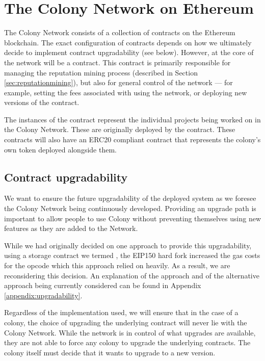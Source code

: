 \section{The Colony Network on Ethereum}\label{sec:colonynetwork}

The Colony Network consists of a collection of contracts on the Ethereum blockchain. The exact configuration of contracts depends on how we ultimately decide to implement contract upgradability (see below). However, at the core of the network will be a  contract. This contract is primarily responsible for managing the reputation mining process (described in Section \ref{sec:reputationmining}), but also for general control of the network --- for example, setting the fees associated with using the network, or deploying new versions of the  contract.

The instances of the  contract represent the individual projects being worked on in the Colony Network. These are originally deployed by the  contract. These  contracts will also have an ERC20 compliant contract that represents the colony's own token deployed alongside them.

\subsection{Contract upgradability}

We want to ensure the future upgradability of the deployed system as we foresee the Colony Network being continuously developed. Providing an upgrade path is important to allow people to use Colony without preventing themselves using new features as they are added to the Network.

While we had originally decided on one approach to provide this upgradability, using a storage contract we termed , the EIP150 hard fork increased the gas costs for the  opcode which this approach relied on heavily. As a result, we are reconsidering this decision. An explanation of the  approach and of the alternative approach being currently considered can be found in Appendix \ref{appendix:upgradability}.

Regardless of the implementation used, we will ensure that in the case of a colony, the choice of upgrading the underlying  contract will never lie with the Colony Network. While the network is in control of what upgrades are available, they are not able to force any colony to upgrade the underlying contracts. The colony itself must decide that it wants to upgrade to a new version.

